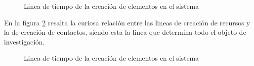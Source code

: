 \begin{figure}
\centering

\caption{Linea de tiempo de la creación de elementos en el sistema}
\label{tiempos_area_1}
\end{figure}

En la figura \ref{tiempos_area_2} resalta la curiosa relación entre las lineas
de creación de recursos y la de creación de contactos, siendo esta la linea que
determina todo el objeto de investigación.

\begin{figure}
\centering

\caption{Linea de tiempo de la creación de elementos en el sistema}
\label{tiempos_area_2}
\end{figure}


